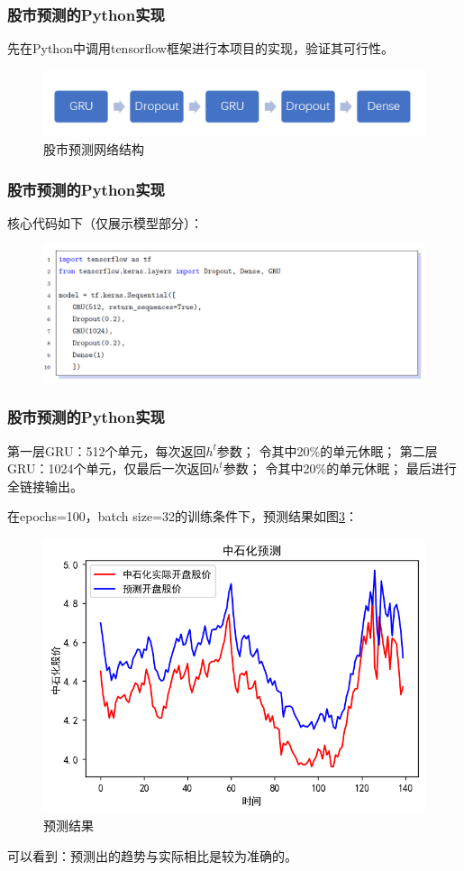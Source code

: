 \documentclass[aspectratio=169, 10pt, utf8, mathserif]{beamer}
\begin{document}
\begin{frame}
	\frametitle{股市预测的Python实现}
	先在Python中调用tensorflow框架进行本项目的实现，验证其可行性。
	\begin{figure}[H]
		\centering
		\includegraphics[width=1\linewidth]{pic/screenshot004}
		\caption{股市预测网络结构}
		\label{fig:screenshot004}
	\end{figure}
\end{frame}	
\begin{frame}
	\frametitle{股市预测的Python实现}
	核心代码如下（仅展示模型部分）：
	\begin{figure}[H]
		\centering
		\includegraphics[width=1\linewidth]{pic/screenshot035}
		\label{fig:screenshot035}
	\end{figure}
	
\end{frame}	
\begin{frame}
	\frametitle{股市预测的Python实现}
	 
	 第一层GRU：512个单元，每次返回$ h^t $参数；
	令其中20\%的单元休眠；
	第二层GRU：1024个单元，仅最后一次返回$ h^t $参数；
	令其中20\%的单元休眠；
	最后进行全链接输出。
	
	在epochs=100，batch size=32的训练条件下，预测结果如图\ref{fig:screenshot005}：
	\begin{figure}[H]
		\centering
		\includegraphics[width=0.4\linewidth]{pic/screenshot005}
		\caption{预测结果}
		\label{fig:screenshot005}
	\end{figure}
	
	可以看到：预测出的趋势与实际相比是较为准确的。
\end{frame}	
\end{document}
